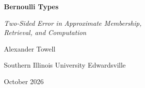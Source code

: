 \begin{titlepage}
\centering
\vspace*{1.6in}

{\Huge\bfseries Bernoulli Types\par}
\vspace{1em}
{\Large\itshape Two-Sided Error in Approximate Membership,\\[0.3em]
Retrieval, and Computation\par}

\vspace{2in}

{\Large Alexander Towell\par}
\vspace{0.5em}
{\large Southern Illinois University Edwardsville\par}
\vspace{1.5em}
{\large October 2026\par}

\vfill
\end{titlepage}
